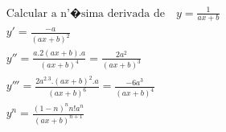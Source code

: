 \begin{ex}
\begin{align}
&\text{Calcular a n'�sima derivada de}\quad y=\frac{1}{ax+b}\nonumber\\
&y'=\frac{-a}{(ax+b)^2}\nonumber\\
&y''=\frac{a.2(ax+b).a}{(ax+b)^4}=\frac{2a^2}{(ax+b)^3}\nonumber\\
&y'''=\frac{2a^2.3.(ax+b)^2.a}{(ax+b)^6}=\frac{-6a^3}{(ax+b)^4}\nonumber\\
&y^{n}=\frac{(1-n)^{n}n!a^{n}}{(ax+b)^{n+1}}\nonumber
\end{align}
\end{ex}

